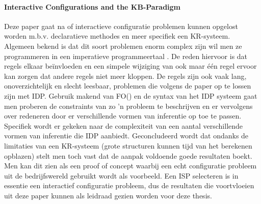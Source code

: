 \paragraph{Interactive Configurations and the KB-Paradigm \cite{vanhertum}}
Deze paper gaat na of interactieve configuratie problemen kunnen opgelost worden m.b.v. declaratieve methodes en meer specifiek een KR-systeem. Algemeen bekend is dat dit soort problemen enorm complex zijn wil men ze programmeren in een imperatieve programmeertaal \cite{gelle96}. De reden hiervoor is dat regels elkaar be\"{i}nvloeden en een simpele wijziging van ook maar \'{e}\'{e}n regel ervoor kan zorgen dat andere regels niet meer kloppen. De regels zijn ook vaak lang, onoverzichtelijk en slecht leesbaar, problemen die volgens de paper op te lossen zijn met IDP. Gebruik makend van FO(\textperiodcentered) en de syntax van het IDP systeem gaat men proberen de constraints van zo 'n probleem te beschrijven en er vervolgens over redeneren door er verschillende vormen van inferentie op toe te passen. Specifiek wordt er gekeken naar de complexiteit van een aantal verschillende vormen van inferentie die IDP aanbiedt. Geconcludeerd wordt dat ondanks de limitaties van een KR-systeem (grote structuren kunnen tijd van het berekenen opblazen) stelt men toch vast dat de aanpak voldoende goede resultaten boekt. Men kan dit zien als een proof of concept waarbij een echt configuratie probleem uit de bedrijfswereld gebruikt wordt als voorbeeld. Een ISP selecteren is in essentie een interactief configuratie probleem, dus de resultaten die voortvloeien uit deze paper kunnen als leidraad gezien worden voor deze thesis.

